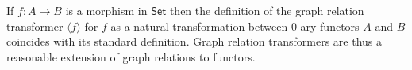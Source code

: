 \documentclass{lmcs}
\theoremstyle{plain}\newtheorem{satz}[thm]{Satz}
\newcommand{\set}{\mathsf{Set}}
\renewcommand{\id}{\mathit{id}}
\begin{document}
If $f : A \to B$ is a morphism in $\set$ then the definition of the
graph relation transformer $\langle f \rangle$ for $f$ as a natural
transformation between $0$-ary functors $A$ and $B$ coincides with its
standard definition.  Graph relation transformers are thus a
reasonable extension of graph relations to functors.
\begin{comment}

\vspace*{0.2in}
  
If $f : A \to B$ is a function with graph relation $\graph{f} = (A, B,
\graph{f}^*)$, then $\langle \id_{A}, f \rangle : A \to A \times B$
and $\langle \id_{A}, f \rangle\, A = \graph{f}^*$.  Moreover, if
$\iota_{\graph{f}} : \graph{f}^* \hookrightarrow A \times B$ is the
inclusion of $\graph{f}^*$ into $A \times B$ then there is an
isomorphism of subobjects
\[\begin{tikzcd}
A \ar[rr, "{\cong}"] \ar[dr, "{\langle \id_{A}, f \rangle}"']
&&{\graph{f}^*} \ar[dl, "{\iota_{\graph{f}}}"]\\
&A \times B
\end{tikzcd}\]

We also note that if $f : A \to B$ is a function seen as a natural
transformation between 0-ary functors, then $\graph{f}$ is (the 0-ary
relation transformer associated with) the graph relation of $f$.
Indeed, we need to apply Definition~\ref{dfn:graph-nat-transf} with $k
= 0$, i.e., to the degenerate relation $\ast : \rel(\ast, \ast)$.  As
degenerate $0$-ary functors, $A$ and $B$ are constant functors, i.e.,
$A\, \ast = A$ and $B\, \ast = B$.  By the universal property of the
product, there exists a unique $h$ making the diagram
\[ \begin{tikzcd}[row sep = large]
        A
        &A
        \ar[l, equal]
        \ar[r, equal]
        \ar[d, dashed, "{h}"]
        &A
        \ar[r, "{f}"]
        &B \\
        &A \times B
        \ar[ul, "{\pi_1}"] \ar[urr, "{\pi_2}"']
\end{tikzcd}\]
commute. Since $\iota_\ast : \ast \to \ast$ is the identity on $\ast$,
and $A\, \id_{\ast} = \id_{A}$, we have $h_{\ast} = h$.  Moreover,
$h_{\overline{A \times B}} = \langle \id_{A}, f \rangle$ is a
monomorphism in $\set$ because $\id_{A}$ is.  Then,
$\iota_{f^\wedge\ast} = \langle \id_{A}, f \rangle$ and $f^\wedge\ast
= A$, from which we deduce that $\iota_{f^\wedge\ast} f^\wedge\ast =
\langle \id_{A}, f \rangle\, A = \graph{f}^*$. This ensures that the
graph of $f$ as a 0-ary natural transformation coincides with the
graph of $f$ as a morphism in $\set$, and so that
Definition~\ref{dfn:graph-nat-transf} is a reasonable generalization
of Definition~\ref{def:graph}.


\end{comment}
\end{document}
